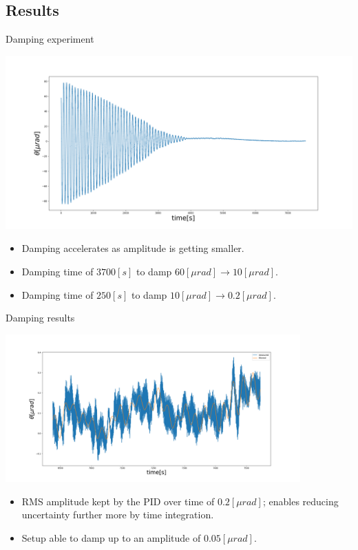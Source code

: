 \documentclass{beamer}
\begin{document}
\subsection{Results}
\begin{frame}{Damping experiment}
	\begin{center}		
		\includegraphics[width=1\textwidth,keepaspectratio]{measured oscillation angle.png}
	\end{center}
	\begin{itemize}	
		
		\item Damping accelerates as amplitude is getting smaller.
		\item Damping time of $3700[s]$ to damp  $ 60 [\mu rad] \rightarrow 10[\mu rad] $.
		\item Damping time of $250[s]$ to damp  $ 10 [\mu rad] \rightarrow 0.2[\mu rad] $.

						
	\end{itemize}
\end{frame}
\begin{frame}{Damping results}
	\begin{center}		
		\includegraphics[width=0.85\textwidth,keepaspectratio]{measured oscillation angle1.png}
	\end{center}
	\begin{itemize}	
		\item RMS amplitude kept by the PID over time of $ 0.2 [\mu rad]$; enables reducing uncertainty further more by time integration.	
		\item Setup able to damp up to an amplitude of $0.05[\mu rad]$.					
	\end{itemize}
\end{frame}
\end{document}

